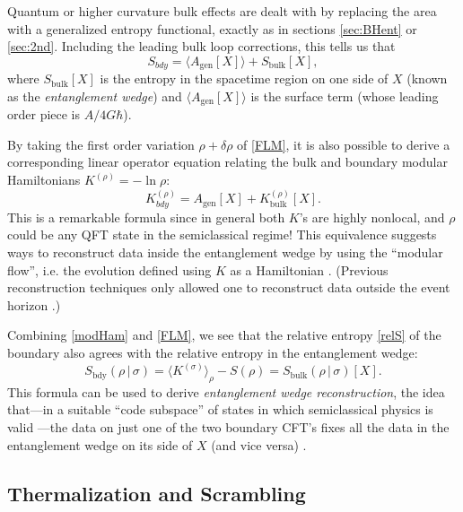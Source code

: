 \documentclass[12pt,a4paper]{article}
\def\be{\begin{equation}}
\def\ee{\end{equation}}
\begin{document}
Quantum \cite{Barrella:2013wja,Faulkner:2013ana,Engelhardt:2014gca,Dong:2017xht} or higher curvature \cite{solodukhin2008entanglement,fursaev2013distributional,camps2014generalized,dong} bulk effects are dealt with by replacing the area with a generalized entropy functional, exactly as in sections \ref{sec:BHent} or \ref{sec:2nd}.  Including the leading bulk loop corrections, this tells us that 
\be\label{FLM}
S_{bdy} = \langle A_\mathrm{gen}[X]\rangle + S_\mathrm{bulk}[X],
\ee
where $S_\mathrm{bulk}[X]$ is the entropy in the spacetime region on one side of $X$ (known as the \emph{entanglement wedge}) and $\langle A_\mathrm{gen}[X]\rangle$ is the surface term (whose leading order piece is $A/4G\hbar$).

By taking the first order variation $\rho + \delta \rho$ of \eqref{FLM}, it is also possible to derive \cite{Jafferis:2015del,Dong:2016eik} a corresponding linear operator equation relating the bulk and boundary modular Hamiltonians $K^{(\rho)} = -\ln \rho$:
\be\label{modHam}
K^{(\rho)}_{bdy} = A_\mathrm{gen}[X] + K^{(\rho)}_\mathrm{bulk}[X].
\ee 
This is a remarkable formula since in general both $K$'s are highly nonlocal, and $\rho$ could be any QFT state in the semiclassical regime!  This equivalence suggests ways to reconstruct data inside the entanglement wedge by using the ``modular flow'', i.e. the evolution defined using $K$ as a Hamiltonian \cite{Jafferis:2015del,Faulkner:2017vdd,Almheiri:2017fbd}.  (Previous reconstruction techniques only allowed one to reconstruct data outside the event horizon \cite{HKLL}.)

Combining \eqref{modHam} and \eqref{FLM}, we see that the relative entropy \eqref{relS} of the boundary also agrees with the relative entropy in the entanglement wedge:
\be
S_\mathrm{bdy}(\rho \,|\, \sigma) = \langle K^{(\sigma)} \rangle_\rho - S(\rho) = 
S_\mathrm{bulk}(\rho \,|\, \sigma)[X].
\ee
This formula can be used to derive \emph{entanglement wedge reconstruction}, the idea that---in a suitable ``code subspace'' of states in which semiclassical physics is valid \cite{Almheiri:2014lwa,Dong:2016eik}---the data on just one of the two boundary CFT's fixes all the data in the entanglement wedge on its side of $X$ (and vice versa)
\cite{Czech:2012bh,Wall:2012uf,Headrick:2014cta,Pastawski:2015qua,Dong:2016eik}. 
 
\subsection{Thermalization and Scrambling}
\end{document}
